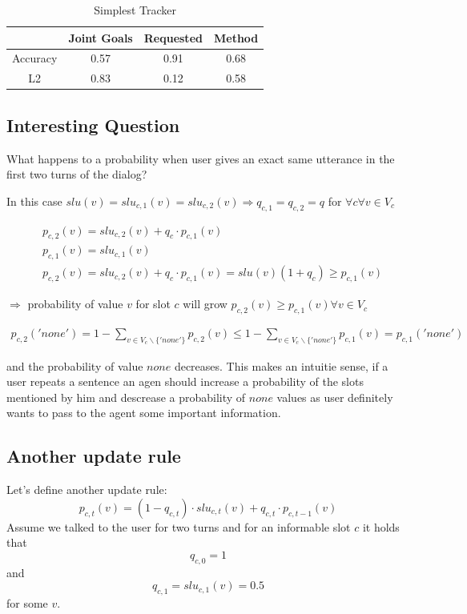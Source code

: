\documentclass[12pt,titlepage,a4paper]{article}
\begin{document}
    \begin{table}[ht]
        \centering
        \begin{tabular}{|c c c c|}
        \hline
                    & Joint Goals   & Requested & Method \\ 
        \hline
        Accuracy   & 0.57          & 0.91      & 0.68 \\ 
        L2         & 0.83          & 0.12      & 0.58  \\
        \hline
        \end{tabular}
        \caption{Simplest Tracker}
        \label{baseline_tracker_results}
    \end{table}

\subsection{Interesting Question}
What happens to a probability when user gives an exact same utterance in
the first two turns of the dialog?

In this case $slu(v) = slu_{c, 1}(v) = slu_{c,2}(v) \Rightarrow q_{c,1} = q_{c, 2} = q$ for $\forall c \forall v \in V_c $

\begin{align*}
    &p_{c,2}(v) = slu_{c,2}(v) + q_c \cdot p_{c, 1}(v) 
    \\
    &p_{c,1}(v) = slu_{c,1}(v)
    \\
    &p_{c, 2}(v) = slu_{c,2}(v) + q_c \cdot p_{c, 1}(v) = slu(v)(1 + q_c) \geq p_{c,1}(v)
\end{align*}

$\Rightarrow$ probability of value $v$  for slot $c$ will grow $p_{c,2}(v) \geq p_{c,1}(v) \forall v \in V_c $

\begin{align*}
    p_{c,2}('none') = 1 - \sum_{v \in V_{c} \backslash \{'none'\}} p_{c,2}(v) \leq 1 - \sum_{v \in V_{c} \backslash \{'none'\}} p_{c,1}(v)  = p_{c,1}('none')
\end{align*}

\noindent and the probability of value $none$ decreases.
This makes an intuitie sense, if a user repeats a sentence an agen should increase a probability of the slots mentioned by him and descrease a probability of $none$ values as user definitely wants to pass to the agent some important information.

\subsection{Another update rule}
Let's define another update rule:
\begin{equation}
    p_{c,t}(v) = (1-q_{c,t})\cdot slu_{c,t}(v) + q_{c,t} \cdot p_{c,t-1}(v)
\end{equation}
Assume we talked to the user for two turns and for an informable slot $c$ it holds that 
\begin{equation}
    \label{eqn:q_c_0_1}
    q_{c, 0} = 1
\end{equation}
and 
\begin{equation}
    \label{eqn:q_c_1}
    q_{c, 1} = slu_{c,1}(v) = 0.5
\end{equation}
for some $v$.
\end{document}
